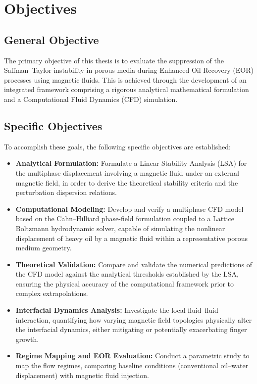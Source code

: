 \section{Objectives}

\subsection{General Objective}
The primary objective of this thesis is to evaluate the suppression of the Saffman--Taylor instability in porous media during Enhanced Oil Recovery (EOR) processes using magnetic fluids. This is achieved through the development of an integrated framework comprising a rigorous analytical mathematical formulation and a Computational Fluid Dynamics (CFD) simulation.

\subsection{Specific Objectives}
To accomplish these goals, the following specific objectives are established:

\begin{itemize}
    \item \textbf{Analytical Formulation:} Formulate a Linear Stability Analysis (LSA) for the multiphase displacement involving a magnetic fluid under an external magnetic field, in order to derive the theoretical stability criteria and the perturbation dispersion relations.

    \item \textbf{Computational Modeling:} Develop and verify a multiphase CFD model based on the Cahn--Hilliard phase-field formulation coupled to a Lattice Boltzmann hydrodynamic solver, capable of simulating the nonlinear displacement of heavy oil by a magnetic fluid within a representative porous medium geometry.

    \item \textbf{Theoretical Validation:} Compare and validate the numerical predictions of the CFD model against the analytical thresholds established by the LSA, ensuring the physical accuracy of the computational framework prior to complex extrapolations.

    \item \textbf{Interfacial Dynamics Analysis:} Investigate the local fluid--fluid interaction, quantifying how varying magnetic field topologies physically alter the interfacial dynamics, either mitigating or potentially exacerbating finger growth.

    \item \textbf{Regime Mapping and EOR Evaluation:} Conduct a parametric study to map the flow regimes, comparing baseline conditions (conventional oil--water displacement) with magnetic fluid injection.
\end{itemize}